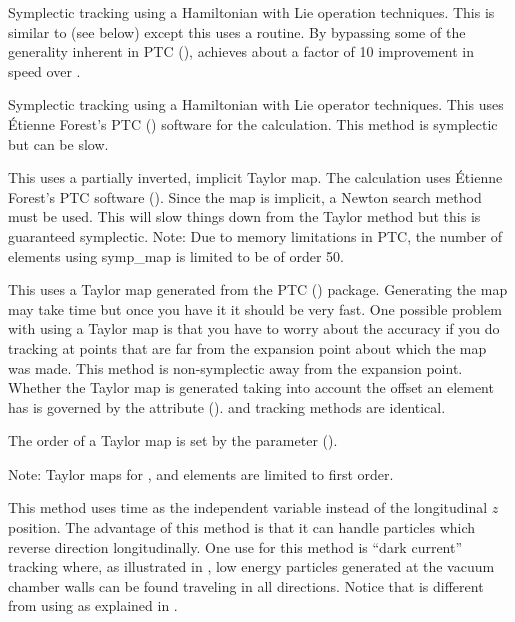 \begin{description}
\item[\vn{Symp_Lie_Bmad}]
Symplectic tracking using a Hamiltonian with Lie operation techniques.
This is similar to  (see below) except this uses a
\bmad routine. By bypassing some of the generality inherent in PTC
(),  achieves about a factor of 10
improvement in speed over .

\item[\vn{Symp_Lie_PTC}]
Symplectic tracking using a Hamiltonian with Lie operator techniques.
This uses \'Etienne Forest's PTC () software for the
calculation. This method is symplectic but can be slow.

\item[\vn{Symp_Map}]
This uses a partially inverted, implicit Taylor map. The calculation
uses \'Etienne Forest's PTC software ().  Since the
map is implicit, a Newton search method must be used. This will slow
things down from the Taylor method but this is guaranteed
symplectic. Note: Due to memory limitations in PTC, the number of
elements using symp_map is limited to be of order 50.

\item[\vn{Taylor}]
This uses a Taylor map generated from the PTC ()
package. Generating the map may take time but once you have it it
should be very fast. One possible problem with using a Taylor map is
that you have to worry about the accuracy if you do tracking at points
that are far from the expansion point about which the map was
made. This method is non-symplectic away from the expansion
point. Whether the Taylor map is generated taking into account the
offset an element has is governed by the 
attribute ().  and 
tracking methods are identical. 

The order of a Taylor map is set by the 
parameter ().

Note: Taylor maps for , and
 elements are limited to first order.

\item[\vn{Time_Runge_Kutta}]
This method uses time as the independent variable instead of the longitudinal $z$
position. The advantage of this method is that it can handle particles which reverse
direction longitudinally.  One use for this method is ``dark current'' tracking where, as
illustrated in , low energy particles generated at the vacuum chamber
walls can be found traveling in all directions. Notice that  is
different from using  as explained in .

\end{description}

